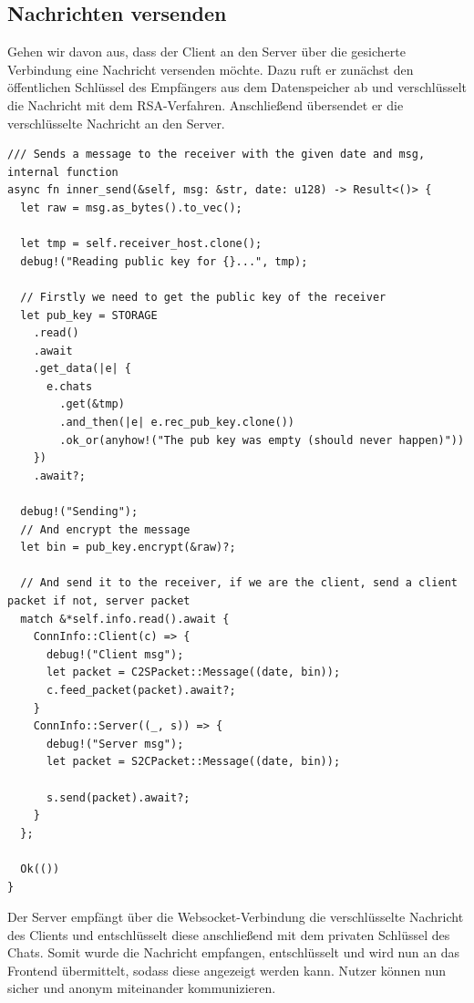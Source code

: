 \documentclass[a4paper,ngerman, headheight=28pt,12pt]{scrartcl}
\begin{document}
\subsection{Nachrichten versenden}
Gehen wir davon aus, dass der Client an den Server über die gesicherte Verbindung eine Nachricht versenden möchte. Dazu ruft er zunächst den öffentlichen Schlüssel des Empfängers aus dem Datenspeicher ab und verschlüsselt die Nachricht mit dem RSA-Verfahren. Anschließend übersendet er die verschlüsselte Nachricht an den Server.
\begin{verbatim}
/// Sends a message to the receiver with the given date and msg, internal function
async fn inner_send(&self, msg: &str, date: u128) -> Result<()> {
  let raw = msg.as_bytes().to_vec();

  let tmp = self.receiver_host.clone();
  debug!("Reading public key for {}...", tmp);

  // Firstly we need to get the public key of the receiver
  let pub_key = STORAGE
    .read()
    .await
    .get_data(|e| {
      e.chats
        .get(&tmp)
        .and_then(|e| e.rec_pub_key.clone())
        .ok_or(anyhow!("The pub key was empty (should never happen)"))
    })
    .await?;

  debug!("Sending");
  // And encrypt the message
  let bin = pub_key.encrypt(&raw)?;

  // And send it to the receiver, if we are the client, send a client packet if not, server packet
  match &*self.info.read().await {
    ConnInfo::Client(c) => {
      debug!("Client msg");
      let packet = C2SPacket::Message((date, bin));
      c.feed_packet(packet).await?;
    }
    ConnInfo::Server((_, s)) => {
      debug!("Server msg");
      let packet = S2CPacket::Message((date, bin));

      s.send(packet).await?;
    }
  };

  Ok(())
}
\end{verbatim}
Der Server empfängt über die Websocket-Verbindung die verschlüsselte Nachricht des Clients und entschlüsselt diese anschließend mit dem privaten Schlüssel des Chats. Somit wurde die Nachricht empfangen, entschlüsselt und wird nun an das Frontend übermittelt, sodass diese angezeigt werden kann. Nutzer können nun sicher und anonym miteinander kommunizieren.
\end{document}
